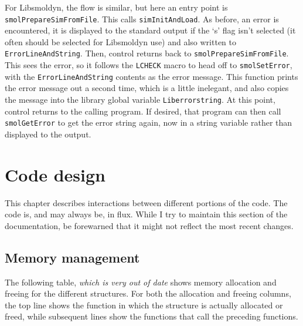 \documentclass {scrbook}
\newcommand {\ttt} {\texttt}
\begin{document}
For Libsmoldyn, the flow is similar, but here an entry point is \ttt{smolPrepareSimFromFile}. This calls \ttt{simInitAndLoad}. As before, an error is encountered, it is displayed to the standard output if the `s' flag isn't selected (it often should be selected for Libsmoldyn use) and also written to \ttt{ErrorLineAndString}. Then, control returns back to \ttt{smolPrepareSimFromFile}. This sees the error, so it follows the \ttt{LCHECK} macro to head off to \ttt{smolSetError}, with the \ttt{ErrorLineAndString} contents as the error message. This function prints the error message out a second time, which is a little inelegant, and also copies the message into the library global variable \ttt{Liberrorstring}. At this point, control returns to the calling program. If desired, that program can then call \ttt{smolGetError} to get the error string again, now in a string variable rather than displayed to the output.

\chapter{Code design}

This chapter describes interactions between different portions of the code. The code is, and may always be, in flux. While I try to maintain this section of the documentation, be forewarned that it might not reflect the most recent changes.

\section{Memory management}

The following table, \emph{which is very out of date} shows memory allocation and freeing for the different structures. For both the allocation and freeing columns, the top line shows the function in which the structure is actually allocated or freed, while subsequent lines show the functions that call the preceding functions.
\end{document}
